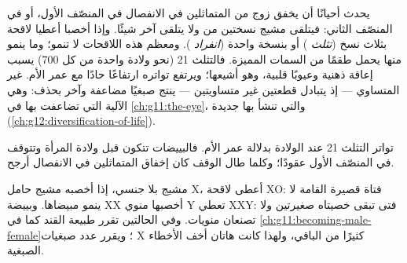 \begin{proposition}\label{prop:g12:meiosis-genetic-shuffling:errors}
يحدث أحيانًا أن يخفق زوج من المتماثلين في الانفصال في المنصّف الأول، أو
 في المنصّف الثاني: فيتلقى مشيج نسختين من  ولا يتلقى آخر
شيئًا. وإذا أخصبا أعطيا لاقحة بثلاث نسخ (\emph{تثلث }) أو بنسخة
واحدة (\emph{انفراد }). ومعظم هذه اللاقحات لا تنمو؛ وما ينمو منها
يحمل طقمًا من السمات المميزة. فالتثلث  21 (نحو ولادة واحدة من كل
700) يسبب إعاقة ذهنية وعيوبًا قلبية، وهو أشيعها؛ ويرتفع تواتره ارتفاعًا
حادًا مع عمر الأم.  غير المتساوي --- إذ يتبادل  قطعتين
غير متساويتين --- ينتج صبغيًا  مضاعفة وآخر بحذف: وهي الآلية التي
تضاعفت بها   في \cref{ch:g11:the-eye}، والتي تنشأ بها
 جديدة (\cref{ch:g12:diversification-of-life}).
\end{proposition}
\admitted

\begin{omfigure}

{\small تواتر التثلث  21 عند الولادة بدلالة عمر الأم. فالبييضات
تتكون قبل ولادة المرأة وتتوقف في المنصّف الأول عقودًا؛ وكلما طال الوقف
كان إخفاق المتماثلين في الانفصال أرجح.}
\end{omfigure}

\begin{example}\label{ex:g12:meiosis-genetic-shuffling:sexchrom}
مشيج بلا  جنسي، إذا أخصبه مشيج حامل X، أعطى لاقحة XO: فتاة قصيرة
القامة لا ينمو مبيضاها. وبييضة XX أخصبها منوي Y تعطي XXY: فتى تبقى
خصيتاه صغيرتين ولا تصنعان منويات. وفي الحالتين تقرر  طبيعة القند كما
في \cref{ch:g11:becoming-male-female}؛ ويقرر عدد صبغيات X كثيرًا من
الباقي، ولهذا كانت هاتان أخف الأخطاء الصبغية.
\end{example}

